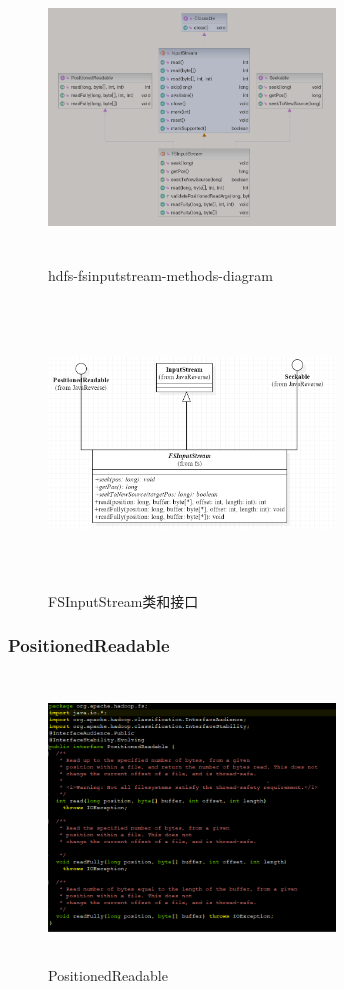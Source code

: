 	\begin{figure}[H]
		\centering
		\includegraphics[width=3in,height=3in]{hdfs-fsinputstream-methods-diagram.png}
		\caption{hdfs-fsinputstream-methods-diagram}
		\label{fig:graph3}
	\end{figure}
	\begin{figure}[H]
		\centering
		\includegraphics[width=3in,height=3in]{UML.png}
		\caption{FSInputStream类和接口}
		\label{fig:graph4}
	\end{figure}
	
	\subsubsection{PositionedReadable}
	\begin{figure}[H]
		\centering
		\includegraphics[width=3in,height=3in]{PositionedReadable.png}
		\caption{PositionedReadable}
		\label{fig:graph5}
	\end{figure}
	
